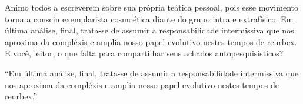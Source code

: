 \documentclass{gescons}
\begin{document}
\begin{multicols}{2}
Animo todos a escreverem sobre sua própria teática pessoal, pois esse movimento torna a conscin exemplarista cosmoética diante do grupo intra e extrafísico. Em última análise, final, trata-se de assumir a responsabilidade intermissiva que nos aproxima da compléxis e amplia nosso papel evolutivo nestes tempos de reurbex. E você, leitor, o que falta para compartilhar seus achados autopesquisísticos?


\begin{pullquote}
    ``Em última análise, final, trata-se de assumir a responsabilidade intermissiva que nos aproxima da compléxis e amplia nosso papel evolutivo nestes tempos de reurbex.''
\end{pullquote}

    
    \end{multicols}
\end{document}

